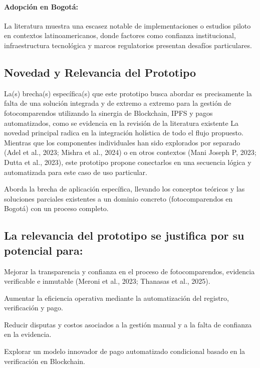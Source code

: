 \paragraph{Adopción en Bogotá:}
 La literatura muestra una escasez notable de implementaciones o estudios piloto en contextos latinoamericanos, donde factores como confianza institucional, infraestructura tecnológica y marcos regulatorios presentan desafíos particulares. \parencite{choquevilca2024blockchain, rezabala2025blockchain}

\subsection{Novedad y Relevancia del Prototipo} 
La(s) brecha(s) específica(s) que este prototipo busca abordar es precisamente la falta de una solución integrada y de extremo a extremo para la gestión de fotocomparendos utilizando la sinergia de Blockchain, IPFS y pagos automatizados, como se evidencia en la revisión de la literatura existente \parencite{yousfi2022its,AnandSingh_ProjectReport_Year}
La novedad principal radica en la integración holística de todo el flujo propuesto. Mientras que los componentes individuales han sido explorados por separado (Adel et al., 2023; Mishra et al., 2024) o en otros contextos (Mani Joseph P, 2023; Dutta et al., 2023), este prototipo propone conectarlos en una secuencia lógica y automatizada para este caso de uso particular. 

Aborda la brecha de aplicación específica, llevando los conceptos teóricos \parencite{swan2015blockchain, antonopoulos2023mastering} y las soluciones parciales existentes \parencite{choquevilca2024blockchain} a un dominio concreto (fotocomparendos en Bogotá) con un proceso completo. 

\subsection{La relevancia del prototipo se justifica por su potencial para:} 
Mejorar la transparencia y confianza en el proceso de fotocomparendos, evidencia verificable e inmutable (Meroni et al., 2023; Thanasas et al., 2025). 

Aumentar la eficiencia operativa mediante la automatización del registro, verificación y pago. 

Reducir disputas y costos asociados a la gestión manual y a la falta de confianza en la evidencia. 

Explorar un modelo innovador de pago automatizado condicional basado en la verificación en Blockchain. 

